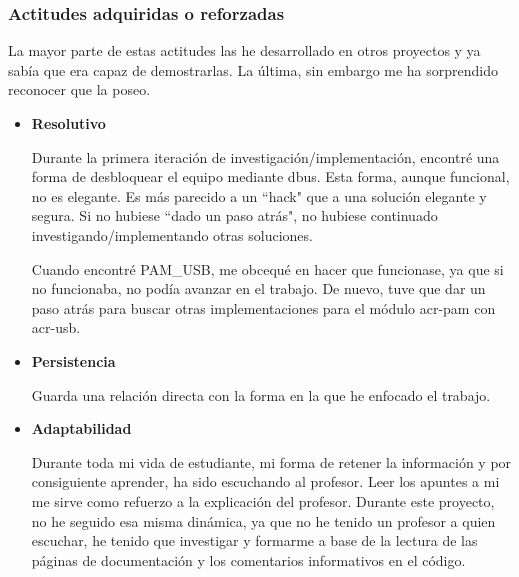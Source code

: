 \documentclass[titlepage, 12pt, a4paper]{article}
\begin{document}
\subsubsection{Actitudes adquiridas o reforzadas}
La mayor parte de estas actitudes las he desarrollado en otros proyectos y ya sabía que era capaz de demostrarlas. La última, sin embargo me ha sorprendido reconocer que la poseo.
\begin{itemize}
	\item{\textbf{Resolutivo}}\par Durante la primera iteración de investigación/implementación, encontré una forma de desbloquear el equipo mediante \gls{dbus}. Esta forma, aunque funcional, no es elegante. Es más parecido a un ``hack" que a una solución elegante y segura. Si no hubiese ``dado un paso atrás", no hubiese continuado investigando/implementando otras soluciones. \par Cuando encontré PAM\_USB, me obcequé en hacer que funcionase, ya que si no funcionaba, no podía avanzar en el trabajo. De nuevo, tuve que dar un paso atrás para buscar otras implementaciones para el módulo \gls{acr-pam} con \gls{acr-usb}.
	\item{\textbf{Persistencia}}\par Guarda una relación directa con la forma en la que he enfocado el trabajo.
	\item{\textbf{Adaptabilidad}}\par Durante toda mi vida de estudiante, mi forma de retener la información y por consiguiente aprender, ha sido escuchando al profesor. Leer los apuntes a mi me sirve como refuerzo a la explicación del profesor. Durante este proyecto, no he seguido esa misma dinámica, ya que no he tenido un profesor a quien escuchar, he tenido que investigar y formarme a base de la lectura de las páginas de documentación y los comentarios informativos en el código.
\end{itemize}
\end{document}
